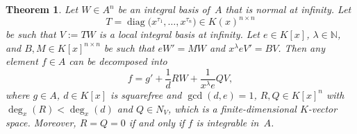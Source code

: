 \documentclass[final,1p,times,authoryear]{elsarticle}
\newtheorem{theorem}{Theorem}
\newcommand{\bN}{ {\mathbb N}}
\def\diag{\operatorname{diag}}
\begin{document}
\begin{theorem}\label{THM:polyred}
Let $W\in A^n$ be an integral basis of~$A$ that is normal at infinity.
Let
\[
  T = \diag\bigl(x^{\tau_1}, \ldots, x^{\tau_n}\bigr) \in K(x)^{n\times n}
\]
be such that $V := TW$ is a local integral basis at infinity.  Let $e\in K[x]$,
$\lambda \in \bN$, and $B, M \in K[x]^{n \times n} $ be such that $eW' = MW$
and $x^\lambda eV' = BV$.  Then any element $f\in A$ can be decomposed into
\begin{equation}\label{EQ:add}
  f = g' + \frac{1}{d} RW + \frac{1}{x^\lambda e} QV,
\end{equation}
where $g\in A$, $d\in K[x]$ is squarefree and $\gcd(d, e)=1$, $R, Q\in K[x]^n$
with $\deg_x(R) < \deg_x(d)$ and $Q\in N_V$, which is a finite-dimensional
$K$-vector space. Moreover, $R=Q=0$ if and only if $f$ is integrable in~$A$.
\end{theorem}
\end{document}
